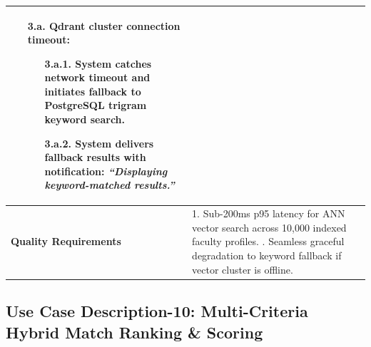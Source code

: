 \begin{table}[H]
\begin{tabularx}{\textwidth}{|l|X|}
\begin{itemize}[leftmargin=*]
    \item[\textbf{3.a.}] \textbf{Qdrant cluster connection timeout:}
    \begin{itemize}[leftmargin=*]
        \item[3.a.1.] System catches network timeout and initiates fallback to PostgreSQL trigram keyword search.
        \item[3.a.2.] System delivers fallback results with notification: \textit{``Displaying keyword-matched results.''}
    \end{itemize}
\end{itemize} \\ \hline
\textbf{Quality Requirements} & 
1. Sub-200ms p95 latency for ANN vector search across 10,000 indexed faculty profiles. \newline
2. Seamless graceful degradation to keyword fallback if vector cluster is offline. \\ \hline
\end{tabularx}
\end{table}

\clearpage
\subsection{Use Case Description-10: Multi-Criteria Hybrid Match Ranking \& Scoring}
\label{subsec:uc10}


